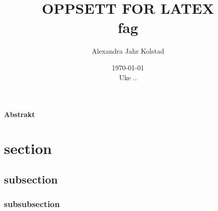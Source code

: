 \documentclass{article}
\begin{document}
\addtocounter{page}{0}

\title{OPPSETT FOR LATEX \\
      \large fag}
\date{\today \\
    \vspace{1mm}
    \large Uke ..}

\author{Alexandra Jahr Kolstad}

\maketitle






\vspace{1cm}


\begin{center}

{\Large\textbf{Abstrakt}} \label{sec:Abstrakt} \\

    \vspace{1cm}

\end{center}


\newpage

\vspace{1cm}

\tableofcontents

\vspace{1cm}


\section{section}

\subsection{subsection}

\subsubsection{subsubsection}
\end{document}

